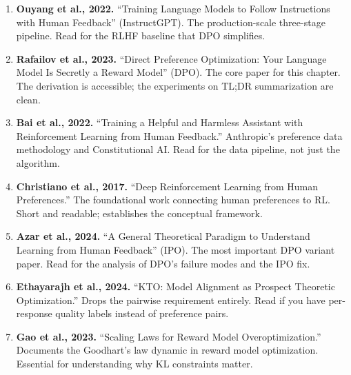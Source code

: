 \begin{enumerate}[nosep]
  \item \textbf{Ouyang et al., 2022.} ``Training Language Models to Follow Instructions with Human Feedback'' (InstructGPT). The production-scale three-stage pipeline. Read for the RLHF baseline that DPO simplifies.
  \item \textbf{Rafailov et al., 2023.} ``Direct Preference Optimization: Your Language Model Is Secretly a Reward Model'' (DPO). The core paper for this chapter. The derivation is accessible; the experiments on TL;DR summarization are clean.
  \item \textbf{Bai et al., 2022.} ``Training a Helpful and Harmless Assistant with Reinforcement Learning from Human Feedback.'' Anthropic's preference data methodology and Constitutional AI. Read for the data pipeline, not just the algorithm.
  \item \textbf{Christiano et al., 2017.} ``Deep Reinforcement Learning from Human Preferences.'' The foundational work connecting human preferences to RL. Short and readable; establishes the conceptual framework.
  \item \textbf{Azar et al., 2024.} ``A General Theoretical Paradigm to Understand Learning from Human Feedback'' (IPO). The most important DPO variant paper. Read for the analysis of DPO's failure modes and the IPO fix.
  \item \textbf{Ethayarajh et al., 2024.} ``KTO: Model Alignment as Prospect Theoretic Optimization.'' Drops the pairwise requirement entirely. Read if you have per-response quality labels instead of preference pairs.
  \item \textbf{Gao et al., 2023.} ``Scaling Laws for Reward Model Overoptimization.'' Documents the Goodhart's law dynamic in reward model optimization. Essential for understanding why KL constraints matter.
\end{enumerate}

\flushbottom
